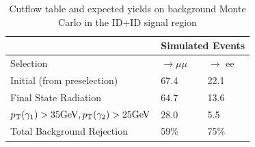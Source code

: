 \begin{table}[htb!]
	\begin{center}
		\caption[Cutflow table and expected yields on background Monte Carlo in the ID+ID signal region]{Cutflow table and expected yields on background Monte Carlo in the ID+ID signal region}
		\label{tab:cuts_bkg}
		\begin{tabular}{l|l|l}
			& \multicolumn{2}{l}{Simulated Events}\\
			\hline
			Selection & \PZ $\rightarrow \mu \mu$  & \PZ $\rightarrow$ ee\\
			\hline
			\hline
			Initial (from preselection) & 67.4 & 22.1 \\
			\hline
			Final State Radiation & 64.7 & 13.6\\
			\hline
			$p_{\mathrm{T}}(\gamma_1)>35 \text{GeV}, p_{\mathrm{T}}(\gamma_2)>25 \text{GeV}$ & 28.0 & 5.5 \\
			\hline
			\hline
			Total Background Rejection & 59\% & 75\%\\
			\hline
		\end{tabular}
	\end{center}
\end{table}

